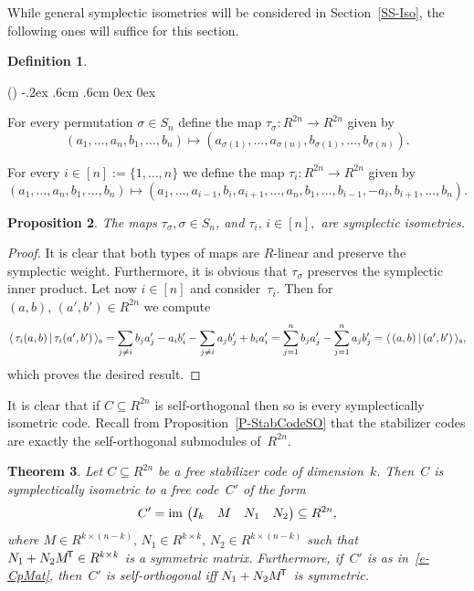 \documentclass[11pt]{article}
\newtheorem{theo}{Theorem}[section]
\newtheorem{prop}[theo]{Proposition}
\theoremstyle{definition}
\newtheorem{defi}[theo]{Definition}
\numberwithin{equation}{section}
\newcommand{\im}{\mbox{\rm im}\,}
\newcommand{\T}{\mbox{$\!^{\sf T}$}}
\newcommand{\inners}[2]{\mbox{$\langle{\,{#1}\,}|\,{#2}\,\rangle_{\rm s}$}}
\newcounter{alp}
\newcounter{rom}
\newenvironment{alphalist}{\begin{list}{(\alph{alp})\hfill}{\usecounter{alp}
     \topsep-.2ex \labelwidth.6cm \leftmargin.6cm \labelsep0cm
     \rightmargin0cm \parsep0ex \itemsep0ex}}{\end{list}}
\begin{document}
While general symplectic isometries will be considered in Section~\ref{SS-Iso}, the following ones will suffice for this section.

\begin{defi}\label{D-SEquiv}
\begin{alphalist}
\item For every permutation $\sigma\in S_n$ define the map $\tau_\sigma: R^{2n}\longrightarrow R^{2n}$ given by
      \[
        (a_1,\ldots,a_n,b_1,\ldots,b_n)\longmapsto (a_{\sigma(1)},\ldots,a_{\sigma(n)},b_{\sigma(1)},\ldots,b_{\sigma(n)}).
      \]
\item For every $i\in[n]:=\{1,\ldots,n\}$ we define the map $\tau_i: R^{2n}\longrightarrow R^{2n}$ given by
      \[
        (a_1,\ldots,a_n,b_1,\ldots,b_n)\longmapsto(a_1,\ldots,a_{i-1},b_i,a_{i+1},\ldots,a_n,b_1,\ldots,b_{i-1},-a_i,b_{i+1},\ldots,b_n).
      \]
\end{alphalist}
\end{defi}

\begin{prop}\label{P-SympPres}
The maps $\tau_\sigma, \sigma\in S_n$, and $\tau_i,\,i\in[n],$ are symplectic isometries.
\end{prop}

\begin{proof}
It is clear that both types of maps are $R$-linear and preserve the symplectic weight.
Furthermore, it is obvious that $\tau_\sigma$ preserves the symplectic inner product.
Let now $i\in[n]$ and consider~$\tau_i$. Then for $(a,b),\,(a',b')\in R^{2n}$ we compute
\[
  \inners{\tau_i(a,b)}{\tau_i(a',b')}=\sum_{j\neq i} b_ja'_j-a_ib'_i-\sum_{j\neq i} a_jb'_j+b_ia'_i
   =\sum_{j=1}^n b_ja'_j-\sum_{j=1}^n a_jb'_j=\inners{(a,b)}{(a',b')},
\]
which proves the desired result.
\end{proof}

It is clear that if $C\subseteq R^{2n}$ is self-orthogonal then so is every
symplectically isometric code.
Recall from Proposition~\ref{P-StabCodeSO} that the stabilizer codes are exactly the self-orthogonal submodules of~$R^{2n}$.

\begin{theo}\label{T-FreeCode}
Let $C\subseteq R^{2n}$ be a free stabilizer code of dimension~$k$.
Then~$C$ is symplectically isometric to a free code~$C'$ of the form
\begin{equation}\label{e-CpMat}
  C'=\im\begin{pmatrix}I_k&M&N_1&N_2\end{pmatrix}\subseteq R^{2n},
\end{equation}
where $M\in R^{k\times(n-k)},\, N_1\in R^{k\times k},\,N_2\in R^{k\times(n-k)}$ such that $N_1+N_2M\T\in R^{k\times k}$
is a symmetric matrix.
Furthermore, if~$C'$ is as in~\eqref{e-CpMat}, then~$C'$ is self-orthogonal iff $N_1+N_2M\T$ is symmetric.
\end{theo}
\end{document}
